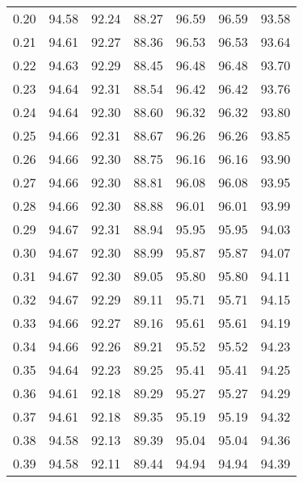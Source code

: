 \begin{tabular}{|c|c|c|c|c|c|c|}
      0.20 &     94.58 &     92.24 &      88.27 &   96.59 &      96.59 &         93.58 \\
      0.21 &     94.61 &     92.27 &      88.36 &   96.53 &      96.53 &         93.64 \\
      0.22 &     94.63 &     92.29 &      88.45 &   96.48 &      96.48 &         93.70 \\
      0.23 &     94.64 &     92.31 &      88.54 &   96.42 &      96.42 &         93.76 \\
      0.24 &     94.64 &     92.30 &      88.60 &   96.32 &      96.32 &         93.80 \\
      0.25 &     94.66 &     92.31 &      88.67 &   96.26 &      96.26 &         93.85 \\
      0.26 &     94.66 &     92.30 &      88.75 &   96.16 &      96.16 &         93.90 \\
      0.27 &     94.66 &     92.30 &      88.81 &   96.08 &      96.08 &         93.95 \\
      0.28 &     94.66 &     92.30 &      88.88 &   96.01 &      96.01 &         93.99 \\
      0.29 &     94.67 &     92.31 &      88.94 &   95.95 &      95.95 &         94.03 \\
      0.30 &     94.67 &     92.30 &      88.99 &   95.87 &      95.87 &         94.07 \\
      0.31 &     94.67 &     92.30 &      89.05 &   95.80 &      95.80 &         94.11 \\
      0.32 &     94.67 &     92.29 &      89.11 &   95.71 &      95.71 &         94.15 \\
      0.33 &     94.66 &     92.27 &      89.16 &   95.61 &      95.61 &         94.19 \\
      0.34 &     94.66 &     92.26 &      89.21 &   95.52 &      95.52 &         94.23 \\
      0.35 &     94.64 &     92.23 &      89.25 &   95.41 &      95.41 &         94.25 \\
      0.36 &     94.61 &     92.18 &      89.29 &   95.27 &      95.27 &         94.29 \\
      0.37 &     94.61 &     92.18 &      89.35 &   95.19 &      95.19 &         94.32 \\
      0.38 &     94.58 &     92.13 &      89.39 &   95.04 &      95.04 &         94.36 \\
      0.39 &     94.58 &     92.11 &      89.44 &   94.94 &      94.94 &         94.39 \\

\end{tabular}
